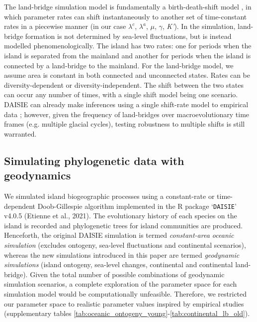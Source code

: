 \documentclass{article}
\begin{document}
The land-bridge simulation model is fundamentally a birth-death-shift model \citep{rabosky_likelihood_2006, stadler_mammalian_2011, hohna_tess_2016}, in which parameter rates can shift instantaneously to another set of time-constant rates in a piecewise manner (in our case $\lambda^c$, $\lambda^a$, $\mu$, $\gamma$, \textit{K’}). In the simulation, land-bridge formation is not determined by sea-level fluctuations, but is instead modelled phenomenologically. The island has two rates: one for periods when the island is separated from the mainland and another for periods when the island is connected by a land-bridge to the mainland. For the land-bridge model, we assume area is constant in both connected and unconnected states. Rates can be diversity-dependent or diversity-independent. The shift between the two states can occur any number of times, with a single shift model \citep{valente_deep_2019, hauffe_lake_2020} being one scenario. DAISIE can already make inferences using a single shift-rate model to empirical data \citep{valente_deep_2019, hauffe_lake_2020}; however, given the frequency of land-bridges over macroevolutionary time frames (e.g. multiple glacial cycles), testing robustness to multiple shifts is still warranted. 

\subsection*{Simulating phylogenetic data with geodynamics}

We simulated island biogeographic processes using a constant-rate or time-dependent Doob-Gillespie algorithm \citep{gillespie_general_1976, allen_efficient_2009} implemented in the R package `\texttt{DAISIE}' v4.0.5 (Etienne et al., 2021). The evolutionary history of each species on the island is recorded and phylogenetic trees for island communities are produced. Henceforth, the original DAISIE simulation \citep{valente_equilibrium_2015} is termed \textit{constant-area oceanic simulation} (excludes ontogeny, sea-level fluctuations and continental scenarios), whereas the new simulations introduced in this paper are termed \textit{geodynamic simulations} (island ontogeny, sea-level changes, continental and continental land-bridge). Given the total number of possible combinations of geodynamic simulation scenarios, a complete exploration of the parameter space for each simulation model would be computationally unfeasible. Therefore, we restricted our parameter space to realistic parameter values inspired by empirical studies (supplementary tables \ref{tab:oceanic_ontogeny_young}-\ref{tab:continental_lb_old}). \\
\end{document}
